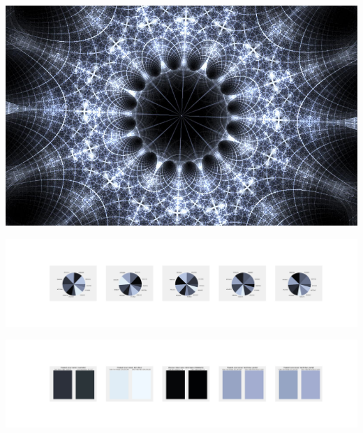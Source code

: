 \documentclass[11pt]{article}
\begin{document}
\begin{landscape}
    \begin{center}
    \includegraphics[width=\textwidth]{./nbimg/file (35).jpg}
    \end{center}

    \begin{center}
    \includegraphics[width=250mm]{./nbimg/pie-278.jpg}
    \end{center}

    \begin{center}
    \includegraphics[width=250mm]{./nbimg/peak-278.jpg}
    \end{center}
    


\end{landscape}
\end{document}
